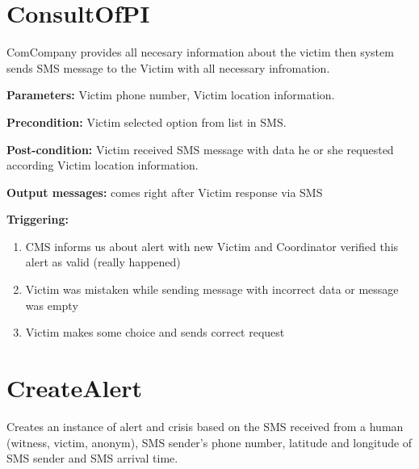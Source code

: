 \section{ConsultOfPI}
\label{operation:ConsultOfPI}
ComCompany provides all necesary information about the victim then system sends
SMS message to the Victim with all necessary infromation. 
\begin{description}

\item \textbf{Parameters:} Victim phone number, Victim location information.
\item \textbf{Precondition:} Victim selected option from list in SMS.
\item \textbf{Post-condition:} Victim received SMS message with data he or she
requested according Victim location information.
\item \textbf{Output messages:} comes right after Victim response via SMS

\item \textbf{Triggering:}
\begin{enumerate}
\item CMS informs us about alert with new Victim and Coordinator verified this
alert as valid (really happened)
\item Victim was mistaken while sending message with incorrect data or message was empty
\item Victim makes some choice and sends correct request
\end{enumerate}
 
\end{description}

\section{CreateAlert}
\label{operation:CreateAlert}
Creates an instance of alert and crisis based on the SMS received from a human
(witness, victim, anonym), SMS sender's phone number, latitude and longitude of
SMS sender and SMS arrival time.


